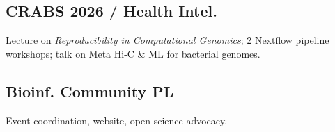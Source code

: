 \documentclass[]{deedy-resume-openfont}
\begin{document}
\begin{minipage}[t]{0.33\textwidth}
\subsection{CRABS 2026 / Health Intel.}
\location{\WhenCrabs{}}
{\footnotesize Lecture on \textit{Reproducibility in Computational Genomics}; 2 Nextflow pipeline workshops; talk on Meta Hi-C \& ML for bacterial genomes.}\\
\sectionsep

\subsection{Bioinf. Community PL}
\location{\WhenBioinfPl{}}
{\footnotesize Event coordination, website, open-science advocacy.}\\
\sectionsep



%
%

\end{minipage}
\hfill
\end{document}
